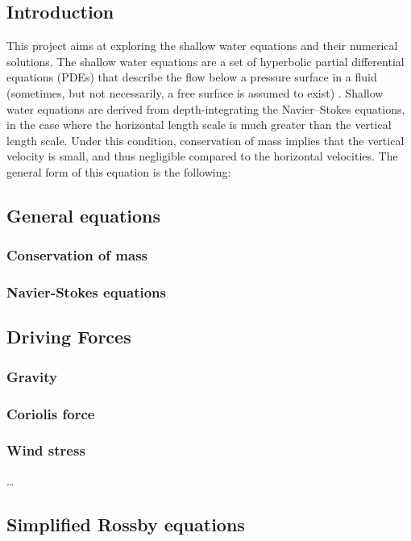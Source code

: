 \documentclass[11pt,a4paper]{report}
\begin{document}
\begin{multicols*}{2}

    \chapter{Introduction}
    This project aims at exploring the shallow water equations and their numerical solutions. The shallow water equations are a set of hyperbolic partial differential equations (PDEs) that describe the flow below a pressure surface in a fluid (sometimes, but not necessarily, a free surface is assumed to exist) .
    Shallow water equations are derived from depth-integrating the Navier–Stokes equations, in the case where the horizontal length scale is much greater than the vertical length scale. Under this condition, conservation of mass implies that the vertical velocity is small, and thus negligible compared to the horizontal velocities.
    The general form of this equation is the following:
    \section{General equations}

    \subsection{Conservation of mass}
    \subsection{Navier-Stokes equations}

    \section{Driving Forces}
    \subsection{Gravity}
    \subsection{Coriolis force}
    \subsection{Wind stress}
    \dots
    \section{Simplified Rossby equations}

\end{multicols*}
\end{document}
